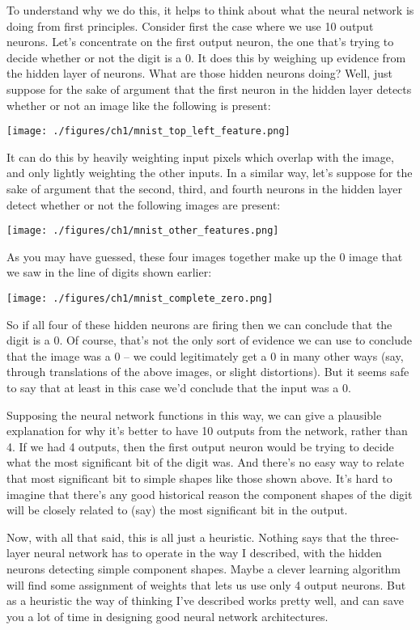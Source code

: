 \documentclass[a4paper,twoside,10pt]{book}
\begin{document}
To understand why we do this, it helps to think about what the neural network is doing from first principles. Consider first the case where we use 10 output neurons. Let's concentrate on the first output neuron, the one that's trying to decide whether or not the digit is a 0. It does this by weighing up evidence from the hidden layer of neurons. What are those hidden neurons doing? Well, just suppose for the sake of argument that the first neuron in the hidden layer detects whether or not an image like the following is present:
\begin{center}
	\texttt{[image: ./figures/ch1/mnist\_top\_left\_feature.png]}
\end{center}
It can do this by heavily weighting input pixels which overlap with the image, and only lightly weighting the other inputs. In a similar way, let's suppose for the sake of argument that the second, third, and fourth neurons in the hidden layer detect whether or not the following images are present:
\begin{center}
	\texttt{[image: ./figures/ch1/mnist\_other\_features.png]}
\end{center}
As you may have guessed, these four images together make up the 0 image that we saw in the line of digits shown earlier:
\begin{center}
	\texttt{[image: ./figures/ch1/mnist\_complete\_zero.png]}
\end{center}
So if all four of these hidden neurons are firing then we can conclude that the digit is a 0. Of course, that's not the only sort of evidence we can use to conclude that the image was a 0 -- we could legitimately get a 0 in many other ways (say, through translations of the above images, or slight distortions). But it seems safe to say that at least in this case we'd conclude that the input was a 0.

Supposing the neural network functions in this way, we can give a plausible explanation for why it's better to have 10 outputs from the network, rather than 4. If we had 4 outputs, then the first output neuron would be trying to decide what the most significant bit of the digit was. And there's no easy way to relate that most significant bit to simple shapes like those shown above. It's hard to imagine that there's any good historical reason the component shapes of the digit will be closely related to (say) the most significant bit in the output.

Now, with all that said, this is all just a heuristic. Nothing says that the three-layer neural network has to operate in the way I described, with the hidden neurons detecting simple component shapes. Maybe a clever learning algorithm will find some assignment of weights that lets us use only 4 output neurons. But as a heuristic the way of thinking I've described works pretty well, and can save you a lot of time in designing good neural network architectures.
\end{document}
